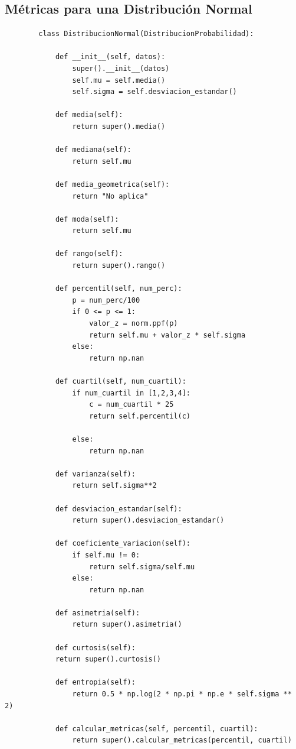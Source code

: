 \documentclass[11pt]{article} %
\begin{document}
	\subsection{Métricas para una Distribución Normal}
	\begin{lstlisting}
		class DistribucionNormal(DistribucionProbabilidad):
		
			def __init__(self, datos):
				super().__init__(datos)
				self.mu = self.media()
				self.sigma = self.desviacion_estandar()
			
			def media(self):
				return super().media()
			
			def mediana(self):
				return self.mu
			
			def media_geometrica(self):
				return "No aplica"
			
			def moda(self):
				return self.mu
			
			def rango(self):
				return super().rango()
			
			def percentil(self, num_perc):
				p = num_perc/100
				if 0 <= p <= 1:
					valor_z = norm.ppf(p)
					return self.mu + valor_z * self.sigma
				else:
					return np.nan
			
			def cuartil(self, num_cuartil):
				if num_cuartil in [1,2,3,4]:
					c = num_cuartil * 25
					return self.percentil(c)
				
				else:
					return np.nan
			
			def varianza(self):
				return self.sigma**2
			
			def desviacion_estandar(self):
				return super().desviacion_estandar()
			
			def coeficiente_variacion(self):
				if self.mu != 0:
					return self.sigma/self.mu
				else:
					return np.nan
			
			def asimetria(self):
				return super().asimetria()
			
			def curtosis(self):
			return super().curtosis()
			
			def entropia(self):
				return 0.5 * np.log(2 * np.pi * np.e * self.sigma ** 2)
			
			def calcular_metricas(self, percentil, cuartil):
				return super().calcular_metricas(percentil, cuartil)
	\end{lstlisting}
	
\end{document}
